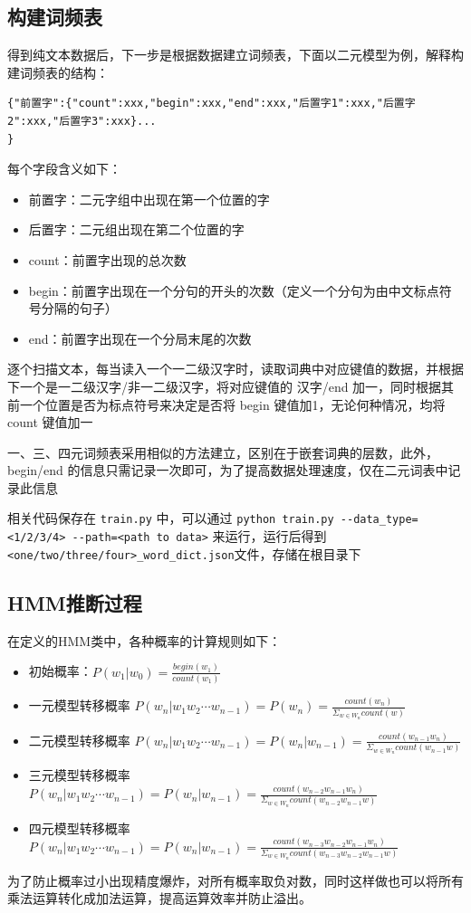 \documentclass{article}
\begin{document}
\begin{spacing}{1.1}
	\subsection{构建词频表}
	\hspace{1.4em}
	得到纯文本数据后，下一步是根据数据建立词频表，下面以二元模型为例，解释构建词频表的结构：
	\begin{lstlisting}
{"前置字":{"count":xxx,"begin":xxx,"end":xxx,"后置字1":xxx,"后置字2":xxx,"后置字3":xxx}...
}
	\end{lstlisting}
	每个字段含义如下：
	\begin{itemize}
		\item 前置字：二元字组中出现在第一个位置的字
		\item 后置字：二元组出现在第二个位置的字
		\item count：前置字出现的总次数
		\item begin：前置字出现在一个分句的开头的次数（定义一个分句为由中文标点符号分隔的句子）
		\item end：前置字出现在一个分局末尾的次数
	\end{itemize}
	
	\hspace{1.4em}
	逐个扫描文本，每当读入一个一二级汉字时，读取词典中对应键值的数据，并根据下一个是一二级汉字/非一二级汉字，将对应键值的 汉字/end 加一，同时根据其前一个位置是否为标点符号来决定是否将 begin 键值加1，无论何种情况，均将 count 键值加一
	
	一、三、四元词频表采用相似的方法建立，区别在于嵌套词典的层数，此外，begin/end 的信息只需记录一次即可，为了提高数据处理速度，仅在二元词表中记录此信息
	
	相关代码保存在 \verb|train.py| 中，可以通过 \verb|python train.py --data_type=<1/2/3/4> --path=<path to data>| 来运行，运行后得到\verb|<one/two/three/four>_word_dict.json|文件，存储在根目录下
	
	\subsection{HMM推断过程}
	在定义的HMM类中，各种概率的计算规则如下：
	\begin{itemize}
		\item 初始概率：$P(w_1|w_0) = \frac{begin(w_1)}{count(w_1)}$
		\item 一元模型转移概率 $P(w_n|w_1w_2\cdots w_{n-1}) =P(w_n) =\frac{count(w_n)}{\Sigma_{w\in W_n} count(w)}$
		\item 二元模型转移概率 $P(w_n|w_1w_2\cdots w_{n-1}) =P(w_n|w_{n-1}) =\frac{count(w_{n-1}w_n)}{\Sigma_{w\in W_n} count(w_{n-1}w)}$
		\item 三元模型转移概率 $P(w_n|w_1w_2\cdots w_{n-1}) =P(w_n|w_{n-1}) =\frac{count(w_{n-2}w_{n-1}w_n)}{\Sigma_{w\in W_n} count(w_{n-2}w_{n-1}w)}$
		\item 四元模型转移概率 $P(w_n|w_1w_2\cdots w_{n-1}) =P(w_n|w_{n-1}) =\frac{count(w_{n-3}w_{n-2}w_{n-1}w_n)}{\Sigma_{w\in W_n} count(w_{n-3}w_{n-2}w_{n-1}w)}$ 	
	\end{itemize}
	为了防止概率过小出现精度爆炸，对所有概率取负对数，同时这样做也可以将所有乘法运算转化成加法运算，提高运算效率并防止溢出。
	

\end{spacing}
\end{document}
